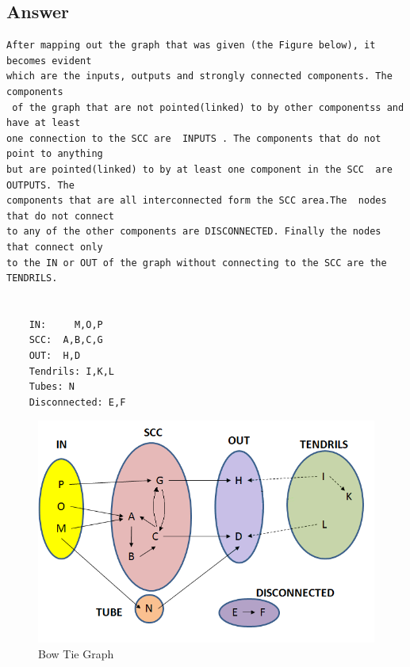\documentclass{article}
\begin{document}
\subsection*{Answer}


\begin{verbatim}
After mapping out the graph that was given (the Figure below), it becomes evident 
which are the inputs, outputs and strongly connected components. The components
 of the graph that are not pointed(linked) to by other componentss and have at least 
one connection to the SCC are  INPUTS . The components that do not point to anything 
but are pointed(linked) to by at least one component in the SCC  are OUTPUTS. The 
components that are all interconnected form the SCC area.The  nodes that do not connect 
to any of the other components are DISCONNECTED. Finally the nodes that connect only 
to the IN or OUT of the graph without connecting to the SCC are the TENDRILS. 


    IN: 	M,O,P
    SCC:  A,B,C,G
    OUT:  H,D
    Tendrils: I,K,L
    Tubes: N
    Disconnected: E,F

\end{verbatim}


\begin{figure}[ht!]
\centering
\includegraphics[width=\linewidth]{BowTie.png}
\caption{Bow Tie Graph \label{overflow}}
\end{figure}




\end{document}
